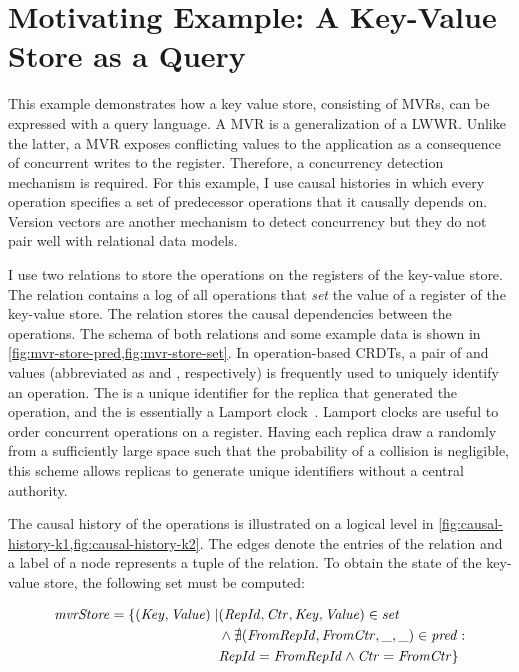\section{Motivating Example: A Key-Value Store as a Query}\label{sec:motivating-example}

This example demonstrates how a key value store,
consisting of \aclp{MVR}, can be expressed with a query language.
A \ac{MVR} is a generalization of a \ac{LWWR}.
Unlike the latter, a \ac{MVR} exposes conflicting values to the application
as a consequence of concurrent writes to the register.
Therefore, a concurrency detection mechanism is required.
For this example, I use causal histories in which every operation specifies
a set of predecessor operations that it causally depends on.
Version vectors are another mechanism to detect concurrency
but they do not pair well with relational data models.

I use two relations to store the operations on the registers of the key-value store.
The  relation contains a log of all operations that \emph{set} the
value of a register of the key-value store.
The  relation stores the causal dependencies between the operations.
The schema of both relations and some example data is shown in
\ref{fig:mvr-store-pred,fig:mvr-store-set}.
In operation-based \acp{CRDT}, a pair of  and  values
(abbreviated as  and , respectively) is frequently used
to uniquely identify an operation.
The  is a unique identifier for the replica that generated the
operation, and the  is essentially a Lamport clock~\cite{lamport2019time}.
Lamport clocks are useful to order concurrent operations on a register.
Having each replica draw a  randomly from a sufficiently large space
such that the probability of a collision is negligible,
this scheme allows replicas to generate unique identifiers without a central authority.



The causal history of the operations is illustrated on a logical level
in \ref{fig:causal-history-k1,fig:causal-history-k2}.
The edges denote the entries of the  relation and a
 label of a node represents a tuple of the
 relation.
To obtain the state of the key-value store, the following set must be computed:

\begin{align*}
    \mathit{mvrStore} = \{ (\mathit{Key}, \mathit{Value}) \mid
     & (\mathit{RepId}, \mathit{Ctr}, \mathit{Key}, \mathit{Value}) \in \mathit{set}                      \\
     & \land \nexists (\mathit{FromRepId}, \mathit{FromCtr}, \mathit{\_}, \mathit{\_}) \in \mathit{pred}: \\
     & \mathit{RepId} = \mathit{FromRepId} \land \mathit{Ctr} = \mathit{FromCtr} \}
\end{align*}

